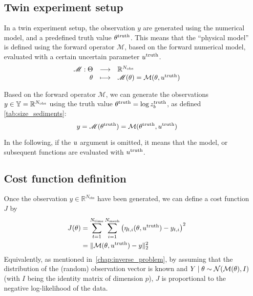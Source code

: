 \documentclass[../../Main_ManuscritThese.tex]{subfiles}
\newcommand{\zob}{z_b}
\begin{document}
\subsection{Twin experiment setup}
In a twin experiment setup, the observation $y$ are generated using
the numerical model, and a predefined truth value
$\theta^{\mathrm{truth}}$.  This means that the ``physical model'' is
defined using the forward operator $\mathscr{M}$, based on the forward
numerical model, evaluated with a certain uncertain parameter
$u^{\mathrm{truth}}$.
\begin{equation}
  \label{eq:twin_exp}
  \begin{array}{rcl}
    \mathscr{M}: \Theta &\longrightarrow & \mathbb{R}^{N_{\mathrm{obs}}} \\
    \theta & \longmapsto &\mathscr{M}(\theta) = \mathcal{M}(\theta, u^{\mathrm{truth}})
  \end{array}
\end{equation}

Based on the forward operator $\mathscr{M}$, we can generate the
observations $y\in \mathbb{Y} = \mathbb{R}^{N_{\mathrm{obs}}}$ using the
truth value $\kk^{\mathrm{truth}}=\log \zob^{\mathrm{truth}}$, as
defined \cref{tab:size_sediments}:
\begin{equation}
  y = \mathscr{M}(\theta^{\mathrm{truth}}) = \mathcal{M}(\theta^{\mathrm{truth}}, u^{\mathrm{truth}})
\end{equation}

In the following, if the $u$ argument is omitted, it means that the
model, or subsequent functions are evaluated with
$u^{\mathrm{truth}}$.
\subsection{Cost function definition}
Once the observation $y \in \mathbb{R}^{N_{\mathrm{obs}}}$ have been generated, we can
define a cost function $J$ by
\begin{align}
  \label{eq:cost_fun_definition}
  J(\theta) &= \sum_{t=1}^{ N_{\mathrm{time}}}\sum_{i=1}^{N_{\mathrm{mesh}}}  \left(\eta_{t,i}(\theta,u^{\mathrm{truth}}) - y_{t, i}\right)^2 \\
         &= \|\mathcal{M}(\theta,u^{\mathrm{truth}}) - y\|_2^2
\end{align}
Equivalently, as mentioned in~\cref{chap:inverse_problem}, by assuming
that the distribution of the (random) observation vector is known and
$Y \mid \theta \sim \mathcal{N}(\mathcal{M}(\theta), I)$ (with $I$ being the
identity matrix of dimension $p$), $J$ is proportional to the negative
log-likelihood of the data.
\end{document}
